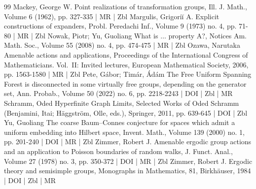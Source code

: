 \begin{thebibliography}{99}
 Mackey, George W. Point realizations of transformation groups, Ill. J. Math., Volume 6 (1962), pp. 327-335 | MR | Zbl
 Margulis, Grigoriĭ A. Explicit constructions of expanders, Probl. Peredachi Inf., Volume 9 (1973) no. 4, pp. 71-80 | MR | Zbl
 Nowak, Piotr; Yu, Guoliang What is $\dots $ property A?, Notices Am. Math. Soc., Volume 55 (2008) no. 4, pp. 474-475 | MR | Zbl
 Ozawa, Narutaka Amenable actions and applications, Proceedings of the International Congress of Mathematicians. Vol. II: Invited lectures, European Mathematical Society, 2006, pp. 1563-1580 | MR | Zbl
 Pete, Gábor; Timár, Ádám The Free Uniform Spanning Forest is disconnected in some virtually free groups, depending on the generator set, Ann. Probab., Volume 50 (2022) no. 6, pp. 2218-2243 | DOI | Zbl | MR
 Schramm, Oded Hyperfinite Graph Limits, Selected Works of Oded Schramm (Benjamini, Itai; Häggström, Olle, eds.), Springer, 2011, pp. 639-645 | DOI | Zbl
 Yu, Guoliang The coarse Baum–Connes conjecture for spaces which admit a uniform embedding into Hilbert space, Invent. Math., Volume 139 (2000) no. 1, pp. 201-240 | DOI | MR | Zbl
 Zimmer, Robert J. Amenable ergodic group actions and an application to Poisson boundaries of random walks, J. Funct. Anal., Volume 27 (1978) no. 3, pp. 350-372 | DOI | MR | Zbl
 Zimmer, Robert J. Ergodic theory and semisimple groups, Monographs in Mathematics, 81, Birkhäuser, 1984 | DOI | Zbl | MR
\end{thebibliography}
